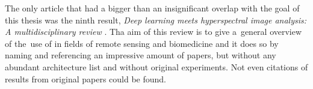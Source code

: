 The only article that had a bigger than an insignificant overlap with the goal of this thesis was the ninth result, \textit{Deep learning meets hyperspectral image analysis: A multidisciplinary review} \cite{review-dl-hs-rs-bio}. Tha aim of this review is to give a~general overview of the~use of  in fields of remote sensing and biomedicine and it does so by naming and referencing an impressive amount of papers, but without any abundant architecture list and without original experiments. Not even citations of results from original papers could be found.
